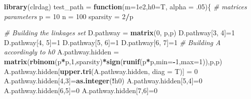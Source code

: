 \documentclass[
]{article}
\newenvironment{Shaded}{\begin{snugshade}}{\end{snugshade}}
\newcommand{\CommentTok}[1]{\textcolor[rgb]{0.56,0.35,0.01}{\textit{#1}}}
\newcommand{\ControlFlowTok}[1]{\textcolor[rgb]{0.13,0.29,0.53}{\textbf{#1}}}
\newcommand{\DataTypeTok}[1]{\textcolor[rgb]{0.13,0.29,0.53}{#1}}
\newcommand{\DecValTok}[1]{\textcolor[rgb]{0.00,0.00,0.81}{#1}}
\newcommand{\FloatTok}[1]{\textcolor[rgb]{0.00,0.00,0.81}{#1}}
\newcommand{\KeywordTok}[1]{\textcolor[rgb]{0.13,0.29,0.53}{\textbf{#1}}}
\newcommand{\NormalTok}[1]{#1}
\newcommand{\OperatorTok}[1]{\textcolor[rgb]{0.81,0.36,0.00}{\textbf{#1}}}
\newcommand{\StringTok}[1]{\textcolor[rgb]{0.31,0.60,0.02}{#1}}
\begin{document}
\begin{Shaded}
\begin{Highlighting}[]
\KeywordTok{library}\NormalTok{(clrdag)}
\NormalTok{test_path =}\StringTok{ }\ControlFlowTok{function}\NormalTok{(}\DataTypeTok{m=}\FloatTok{1e2}\NormalTok{,}\DataTypeTok{h0=}\NormalTok{T, }\DataTypeTok{alpha =} \FloatTok{.05}\NormalTok{)\{}
  \CommentTok{# matrices parameters}
\NormalTok{  p =}\StringTok{ }\DecValTok{10}
\NormalTok{  n =}\StringTok{ }\DecValTok{100}
\NormalTok{  sparsity =}\StringTok{ }\DecValTok{2}\OperatorTok{/}\NormalTok{p}
  
  \CommentTok{# Building the linkages set}
\NormalTok{  D.pathway =}\StringTok{ }\KeywordTok{matrix}\NormalTok{(}\DecValTok{0}\NormalTok{, p,p)}
\NormalTok{  D.pathway[}\DecValTok{3}\NormalTok{, }\DecValTok{4}\NormalTok{]=}\DecValTok{1}
\NormalTok{  D.pathway[}\DecValTok{4}\NormalTok{, }\DecValTok{5}\NormalTok{]=}\DecValTok{1}
\NormalTok{  D.pathway[}\DecValTok{5}\NormalTok{, }\DecValTok{6}\NormalTok{]=}\DecValTok{1}
\NormalTok{  D.pathway[}\DecValTok{6}\NormalTok{, }\DecValTok{7}\NormalTok{]=}\DecValTok{1}
  \CommentTok{# Building A accordingly to h0}
\NormalTok{  A.pathway.hidden =}\StringTok{ }\KeywordTok{matrix}\NormalTok{(}\KeywordTok{rbinom}\NormalTok{(p}\OperatorTok{*}\NormalTok{p,}\DecValTok{1}\NormalTok{,sparsity)}\OperatorTok{*}\KeywordTok{sign}\NormalTok{(}\KeywordTok{runif}\NormalTok{(p}\OperatorTok{*}\NormalTok{p,}\DataTypeTok{min=}\OperatorTok{-}\DecValTok{1}\NormalTok{,}\DataTypeTok{max=}\DecValTok{1}\NormalTok{)),p,p)}
\NormalTok{  A.pathway.hidden[}\KeywordTok{upper.tri}\NormalTok{(A.pathway.hidden, }\DataTypeTok{diag =}\NormalTok{ T)] =}\StringTok{ }\DecValTok{0}
\NormalTok{  A.pathway.hidden[}\DecValTok{4}\NormalTok{,}\DecValTok{3}\NormalTok{]=}\KeywordTok{as.integer}\NormalTok{(}\OperatorTok{!}\NormalTok{h0)}
\NormalTok{  A.pathway.hidden[}\DecValTok{5}\NormalTok{,}\DecValTok{4}\NormalTok{]=}\DecValTok{0}
\NormalTok{  A.pathway.hidden[}\DecValTok{6}\NormalTok{,}\DecValTok{5}\NormalTok{]=}\DecValTok{0}
\NormalTok{  A.pathway.hidden[}\DecValTok{7}\NormalTok{,}\DecValTok{6}\NormalTok{]=}\DecValTok{0}
  

\end{Highlighting}
\end{Shaded}
\end{document}
